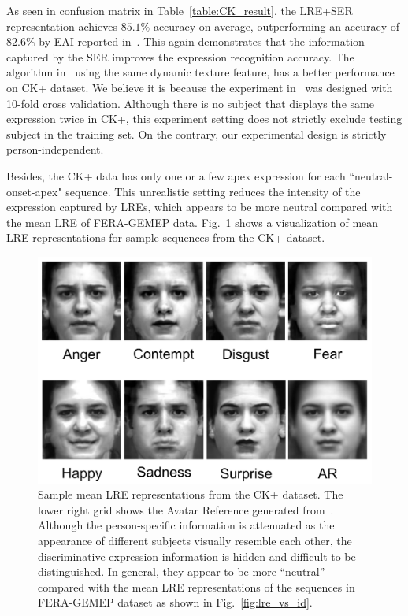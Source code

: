 \documentclass[journal]{IEEEtran}
\begin{document}
As seen in confusion matrix in Table~\ref{table:CK_result}, the LRE+SER representation achieves $85.1\%$ accuracy on average, outperforming an accuracy of $82.6\%$ by EAI reported in~\cite{Yang_SMCB12}. This again demonstrates that the information captured by the SER improves the expression recognition accuracy. The algorithm in~\cite{Zhao_PAMI07} using the same dynamic texture feature, has a better performance on CK+ dataset. We believe it is because the experiment in~\cite{Zhao_PAMI07} was designed with 10-fold cross validation. Although there is no subject that displays the same expression twice in CK+, this experiment setting does not strictly exclude testing subject in the training set. On the contrary, our experimental design is strictly person-independent.

Besides, the CK+ data has only one or a few apex expression for each ``neutral-onset-apex" sequence. This unrealistic setting reduces the intensity of the expression captured by LREs, which appears to be more neutral compared with the mean LRE of FERA-GEMEP data. Fig.~\ref{fig:ck_eai} shows a visualization of mean LRE representations for sample sequences from the CK+ dataset. 

\begin{figure}[htbp]
	\centering
		\includegraphics[width=.7\columnwidth]{pics/ck_eai.png}
	\caption{Sample mean LRE representations from the CK+ dataset. The lower right grid shows the Avatar Reference generated from~\cite{Yang_SMCB12}. Although the person-specific information is attenuated as the appearance of different subjects visually resemble each other, the discriminative expression information is hidden and difficult to be distinguished. In general, they appear to be more ``neutral'' compared with the mean LRE representations of the sequences in FERA-GEMEP dataset as shown in Fig.~\ref{fig:lre_vs_id}.}
	\label{fig:ck_eai}
\end{figure}
\end{document}
